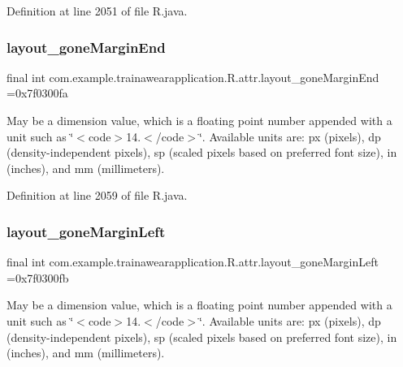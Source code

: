 Definition at line 2051 of file R.\+java.

\mbox{\label{classcom_1_1example_1_1trainawearapplication_1_1_r_1_1attr_a74071c7b63cbbee66d73c874ad80cfe9}} 
\subsubsection{\texorpdfstring{layout\_goneMarginEnd}{layout\_goneMarginEnd}}
{\footnotesize\ttfamily final int com.\+example.\+trainawearapplication.\+R.\+attr.\+layout\+\_\+gone\+Margin\+End =0x7f0300fa\hspace{0.3cm}{\ttfamily [static]}}

May be a dimension value, which is a floating point number appended with a unit such as \char`\"{}$<$code$>$14.\+5sp$<$/code$>$\char`\"{}. Available units are\+: px (pixels), dp (density-\/independent pixels), sp (scaled pixels based on preferred font size), in (inches), and mm (millimeters). 

Definition at line 2059 of file R.\+java.

\mbox{\label{classcom_1_1example_1_1trainawearapplication_1_1_r_1_1attr_a1e84d4025e84fa8f1fa9982bceea7a3e}} 
\subsubsection{\texorpdfstring{layout\_goneMarginLeft}{layout\_goneMarginLeft}}
{\footnotesize\ttfamily final int com.\+example.\+trainawearapplication.\+R.\+attr.\+layout\+\_\+gone\+Margin\+Left =0x7f0300fb\hspace{0.3cm}{\ttfamily [static]}}

May be a dimension value, which is a floating point number appended with a unit such as \char`\"{}$<$code$>$14.\+5sp$<$/code$>$\char`\"{}. Available units are\+: px (pixels), dp (density-\/independent pixels), sp (scaled pixels based on preferred font size), in (inches), and mm (millimeters). 

